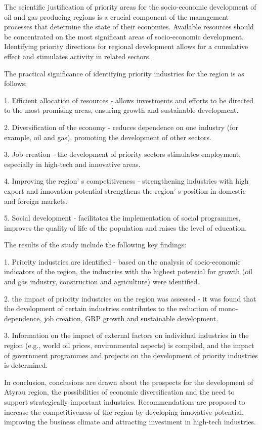 The scientific justification of priority areas for the socio-economic
development of oil and gas producing regions is a crucial component of
the management processes that determine the state of their economies.
Available resources should be concentrated on the most significant areas
of socio-economic development. Identifying priority directions for
regional development allows for a cumulative effect and stimulates
activity in related sectors.

The practical significance of identifying priority industries for the
region is as follows:

1. Efficient allocation of resources - allows investments and efforts to
be directed to the most promising areas, ensuring growth and sustainable
development.

2. Diversification of the economy - reduces dependence on one industry
(for example, oil and gas), promoting the development of other sectors.

3. Job creation - the development of priority sectors stimulates
employment, especially in high-tech and innovative areas.

4. Improving the region' s competitiveness -
strengthening industries with high export and innovation potential
strengthens the region' s position in domestic and
foreign markets.

5. Social development - facilitates the implementation of social
programmes, improves the quality of life of the population and raises
the level of education.

The results of the study include the following key findings:

1. Priority industries are identified - based on the analysis of
socio-economic indicators of the region, the industries with the highest
potential for growth (oil and gas industry, construction and
agriculture) were identified.

2. the impact of priority industries on the region was assessed - it was
found that the development of certain industries contributes to the
reduction of mono-dependence, job creation, GRP growth and sustainable
development.

3. Information on the impact of external factors on individual
industries in the region (e.g., world oil prices, environmental aspects)
is compiled, and the impact of government programmes and projects on the
development of priority industries is determined.

In conclusion, conclusions are drawn about the prospects for the
development of Atyrau region, the possibilities of economic
diversification and the need to support strategically important
industries. Recom\-mendations are proposed to increase the competitiveness
of the region by developing innovative potential, improving the business
climate and attracting investment in high-tech industries.

